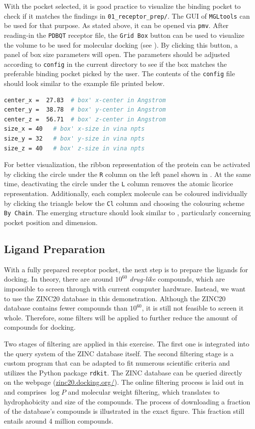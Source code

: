 \documentclass[9pt,tutorial]{livecoms}
\newcommand{\code}[1]{\colorbox{light-gray}{\texttt{#1}}}
\begin{document}
With the pocket selected, it is good practice to visualize the binding pocket to check if it matches the findings in \code{01\_receptor\_prep/}. The GUI of \texttt{MGLtools} can be used for that purpose. As stated above, it can be opened via \code{pmv}. After reading-in the \texttt{PDBQT} receptor file, 
the \texttt{Grid Box} button can be used to visualize the volume to be used for molecular docking (see ). By clicking this button, a panel of box size parameters will open. The parameters should be adjusted according to \code{config} in the current directory to see if the box matches the preferable binding pocket picked by the user. The contents of the \code{config} file should look similar to the example file printed below.
\begin{lstlisting}[language=bash]
center_x =  27.83  # box' x-center in Angstrom
center_y =  38.78  # box' y-center in Angstrom
center_z =  56.71  # box' z-center in Angstrom
size_x = 40   # box' x-size in vina npts
size_y = 32   # box' y-size in vina npts
size_z = 40   # box' z-size in vina npts
\end{lstlisting}
For better visualization, the ribbon representation of the protein can be activated by clicking the circle under the \code{R} column on the left panel shown in . At the same time, deactivating the circle under the \code{L} column removes the atomic licorice representation. Additionally, each complex molecule can be coloured individually by clicking the triangle below the \code{Cl} column and choosing the colouring scheme \code{By Chain}. The emerging structure should look similar to , particularly concerning pocket position and dimension.


\subsection*{Ligand Preparation}
With a fully prepared receptor pocket, the next step is to prepare the ligands for docking. In theory, there are around $10^{60}$ \textit{drug-like} compounds\cite{Reymond_2015}, which are impossible to screen through with current computer hardware. Instead, we want to use the ZINC20 database in this demonstration. Although the ZINC20 database contains fewer compounds than $10^{60}$, it is still not feasible to screen it whole. Therefore, some filters will be applied to further reduce the amount of compounds for docking.

Two stages of filtering are applied in this exercise. The first one is integrated into the query system of the ZINC database itself. The second filtering stage is a custom program that can be adapted to fit numerous scientific criteria and utilizes the Python package \code{rdkit}\cite{rdkit}. The ZINC database can be queried directly on the webpage (\url{zinc20.docking.org/}). The online filtering process is laid out in  and comprises $\log P$ and molecular weight filtering, which translates to hydrophobicity and size of the compounds. The process of downloading a fraction of the database's compounds is illustrated in the exact figure. This fraction still entails around 4 million compounds.
\end{document}
